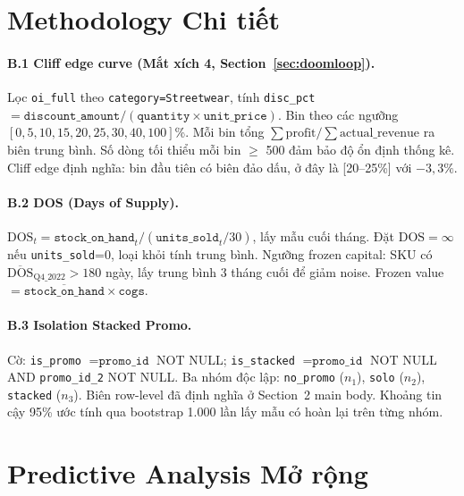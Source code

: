 \documentclass{article}
\begin{document}
\clearpage

\section{Methodology Chi tiết}
\label{app:method}

\paragraph{B.1 Cliff edge curve (Mắt xích 4, Section~\ref{sec:doomloop}).}
Lọc \texttt{oi\_full} theo \texttt{category=Streetwear}, tính
\texttt{disc\_pct} $= \texttt{discount\_amount}/(\texttt{quantity}\times
\texttt{unit\_price})$. Bin theo các ngưỡng $[0, 5, 10, 15, 20, 25, 30,
40, 100]$\%. Mỗi bin tổng $\sum \text{profit}/\sum \text{actual\_revenue}$
ra biên trung bình. Số dòng tối thiểu mỗi bin $\geq$ 500 đảm bảo độ ổn
định thống kê. Cliff edge định nghĩa: bin đầu tiên có biên đảo dấu, ở đây
là [20--25\%] với $-3,3\%$.

\paragraph{B.2 DOS (Days of Supply).}
$\mathrm{DOS}_t = \texttt{stock\_on\_hand}_t / (\texttt{units\_sold}_t/30)$,
lấy mẫu cuối tháng. Đặt $\mathrm{DOS}=\infty$ nếu \texttt{units\_sold}=0,
loại khỏi tính trung bình. Ngưỡng frozen capital: SKU có
$\overline{\mathrm{DOS}}_{\text{Q4\_2022}} > 180$ ngày, lấy trung bình
3 tháng cuối để giảm noise. Frozen value $= \overline{\texttt{stock\_on\_hand}}
\times \texttt{cogs}$.

\paragraph{B.3 Isolation Stacked Promo.}
Cờ: \texttt{is\_promo} $= \texttt{promo\_id}$ NOT NULL; \texttt{is\_stacked}
$= \texttt{promo\_id}$ NOT NULL AND \texttt{promo\_id\_2} NOT NULL. Ba
nhóm độc lập: \texttt{no\_promo} ($n_1$), \texttt{solo} ($n_2$),
\texttt{stacked} ($n_3$). Biên row-level đã định nghĩa ở Section~2 main
body. Khoảng tin cậy 95\% ước tính qua bootstrap 1.000 lần lấy mẫu có
hoàn lại trên từng nhóm.

\section{Predictive Analysis Mở rộng}
\label{app:predictive}
\end{document}
